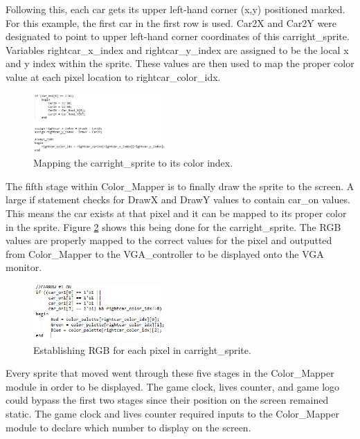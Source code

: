 \documentclass[journal, twocolumn, final,11pt,letterpaper]{IEEEtran}
\begin{document}
Following this, each car gets its upper left-hand corner (x,y) positioned marked.  For this example, the first car in the first row is used.  Car2X and Car2Y were designated to point to upper left-hand corner coordinates of this carright\_sprite. Variables rightcar\_x\_index and rightcar\_y\_index are assigned to be the local x and y index within the sprite.  These values are then used to map the proper color value at each pixel location to rightcar\_color\_idx.   
	
 	\begin{figure}[H]
 		\centering
 		\includegraphics[width=0.45\textwidth]{sprite_description4.png}
 		\caption{Mapping the carright\_sprite to its color index.}
 		\label{fig:sprite_description4}
 	\end{figure}	
	
The fifth stage within Color\_Mapper is to finally draw the sprite to the screen.  A large if statement checks for DrawX and DrawY values to contain car\_on values.  This means the car exists at that pixel and it can be mapped to its proper color in the sprite.  Figure \ref{fig:sprite_description5} shows this being done for the carright\_sprite.  The RGB values are properly mapped to the correct values for the pixel and outputted from Color\_Mapper to the VGA\_controller to be displayed onto the VGA monitor. 

	\begin{figure}[H]
		\centering
		\includegraphics[width=0.45\textwidth]{sprite_description5.png}
		\caption{Establishing RGB for each pixel in carright\_sprite.}
		\label{fig:sprite_description5}
	\end{figure}	
	
Every sprite that moved went through these five stages in the  Color\_Mapper module in order to be displayed.  The game clock, lives counter, and game logo could bypass the first two stages since their position on the screen remained static.  The game clock and lives counter required inputs to the Color\_Mapper module to declare which number to display on the screen. \\
\end{document}
